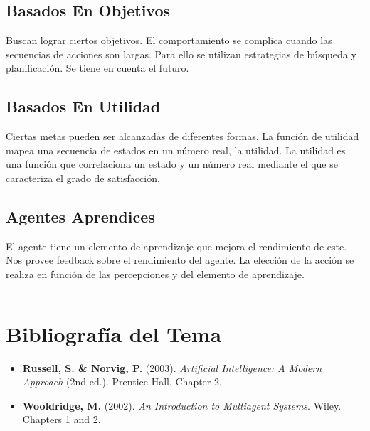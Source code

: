 \subsection{Basados En Objetivos} Buscan lograr ciertos objetivos. El comportamiento se complica cuando las secuencias de acciones son
largas. Para ello se utilizan estrategias de búsqueda y planificación. Se tiene en cuenta el futuro.

\subsection{Basados En Utilidad} Ciertas metas pueden ser alcanzadas de diferentes formas. La función de utilidad mapea una secuencia
de estados en un número real, la utilidad. La utilidad es una función que correlaciona un estado y un número
real mediante el que se caracteriza el grado de satisfacción.

\subsection{Agentes Aprendices} El agente tiene un elemento de aprendizaje que mejora el rendimiento de este. Nos provee feedback sobre
el rendimiento del agente. La elección de la acción se realiza en función de las percepciones y del elemento
de aprendizaje.


\bigskip
\noindent\rule{\textwidth}{0.4pt} %

\section*{Bibliografía del Tema}

\begin{itemize}
    \item \textbf{Russell, S. \& Norvig, P.} (2003). \textit{Artificial Intelligence: A Modern Approach} (2nd ed.). Prentice Hall. Chapter 2.
    
    \item \textbf{Wooldridge, M.} (2002). \textit{An Introduction to Multiagent Systems}. Wiley. Chapters 1 and 2.
\end{itemize}

\newpage

